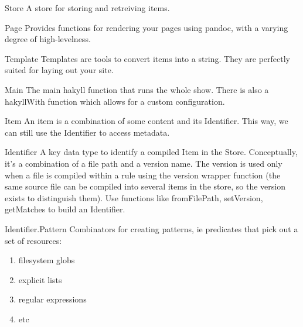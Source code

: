 \documentclass[openany, 12pt]{article}
\begin{document}
\begin{definition}{Store}{}
	A store for storing and retreiving items.
\end{definition}

\begin{definition}{Page}{}
	Provides functions for rendering your pages using pandoc, with a varying
	degree of high-levelness.
\end{definition}

\begin{definition}{Template}{}
	Templates are tools to convert items into a string. They are perfectly
	suited for laying out your site.
\end{definition}

\begin{definition}{Main}{}
	The main hakyll function that runs the whole show. There is also a hakyllWith
	function which allows for a custom configuration.
\end{definition}

\begin{definition}{Item}{}
	An item is a combination of some content and its Identifier. This way, we
	can still use the Identifier to access metadata.
\end{definition}

\begin{definition}{Identifier}{}
	A key data type to identify a compiled Item in the Store. Conceptually, it's a
	combination of a file path and a version name. The version is used only when a
	file is compiled within a rule using the version wrapper function (the same
	source file can be compiled into several items in the store, so the version
	exists to distinguish them). Use functions like fromFilePath, setVersion,
	getMatches to build an Identifier.
\end{definition}

\begin{definition} {Identifier.Pattern}{}
	Combinators for creating patterns, ie predicates that pick out a set of
	resources:
	\begin{multicols}{2}
		\begin{enumerate}[label = {(\arabic*)}]
			\item filesystem globs
			\item explicit lists
			\item regular expressions
			\item etc
		\end{enumerate}
	\end{multicols}
\end{definition}
\end{document}
